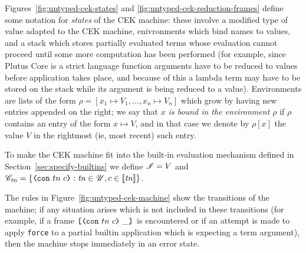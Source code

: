 Figures~\ref{fig:untyped-cek-states} and \ref{fig:untyped-cek-reduction-frames}
define some notation for \textit{states} of the CEK machine: these involve a
modified type of value adapted to the CEK machine, enivronments which bind names
to values, and a stack which stores partially evaluated terms whose evaluation
cannot proceed until some more computation has been performed (for example,
since Plutus Core is a strict language function arguments have to be reduced to
values before application takes place, and because of this a lambda term may
have to be stored on the stack while its argument is being reduced to a value).
Environments are lists of the form $\rho = [x_1 \mapsto V_1, \ldots, x_n \mapsto
  V_n]$ which grow by having new entries appended on the right; we say that
\textit{$x$ is \textit{bound} in the environment $\rho$} if $\rho$ contains an
entry of the form $x \mapsto V$, and in that case we denote by $\rho[x]$ the
value $V$ in the rightmost (ie, most recent) such entry.

To make the CEK machine fit into the built-in evaluation mechanism defined in
Section~\ref{sec:specify-builtins} we define $\mathscr{I} = V$ and $\Con{\tn} =
\{\VCon{tn}{c} : \tn \in \Uni, c \in \denote{\tn}\}$.

The rules in Figure~\ref{fig:untyped-cek-machine} show the transitions of the
machine; if any situation arises which is not included in these transitions (for
example, if a frame $\inAppRightFrame{\VCon{tn}{c}}$ is encountered or if an
attempt is made to apply \texttt{force} to a partial builtin application which
is expecting a term argument), then the machine stops immediately in an error
state.


